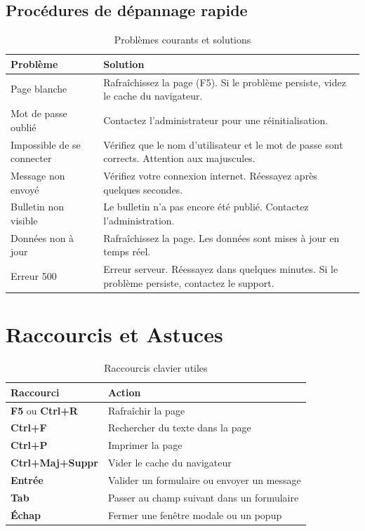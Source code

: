 \documentclass[12pt, a4paper, twoside, openright]{report}
\begin{document}
\section{Procédures de dépannage rapide}

\begin{table}[htbp]
  \centering
  \caption{Problèmes courants et solutions}
  \small
  \begin{tabularx}{\textwidth}{p{4cm} X}
    \toprule
    \textbf{Problème} & \textbf{Solution} \\
    \midrule
    Page blanche & Rafraîchissez la page (F5). Si le problème persiste, videz le cache du navigateur. \\
    Mot de passe oublié & Contactez l'administrateur pour une réinitialisation. \\
    Impossible de se connecter & Vérifiez que le nom d'utilisateur et le mot de passe sont corrects. Attention aux majuscules. \\
    Message non envoyé & Vérifiez votre connexion internet. Réessayez après quelques secondes. \\
    Bulletin non visible & Le bulletin n'a pas encore été publié. Contactez l'administration. \\
    Données non à jour & Rafraîchissez la page. Les données sont mises à jour en temps réel. \\
    Erreur 500 & Erreur serveur. Réessayez dans quelques minutes. Si le problème persiste, contactez le support. \\
    \bottomrule
  \end{tabularx}
\end{table}


\appendix

\chapter{Raccourcis et Astuces}
\label{app:raccourcis}

\begin{table}[htbp]
  \centering
  \caption{Raccourcis clavier utiles}
  \begin{tabularx}{\textwidth}{lX}
    \toprule
    \textbf{Raccourci} & \textbf{Action} \\
    \midrule
    \textbf{F5} ou \textbf{Ctrl+R} & Rafraîchir la page \\
    \textbf{Ctrl+F} & Rechercher du texte dans la page \\
    \textbf{Ctrl+P} & Imprimer la page \\
    \textbf{Ctrl+Maj+Suppr} & Vider le cache du navigateur \\
    \textbf{Entrée} & Valider un formulaire ou envoyer un message \\
    \textbf{Tab} & Passer au champ suivant dans un formulaire \\
    \textbf{Échap} & Fermer une fenêtre modale ou un popup \\
    \bottomrule
  \end{tabularx}
\end{table}
\end{document}
